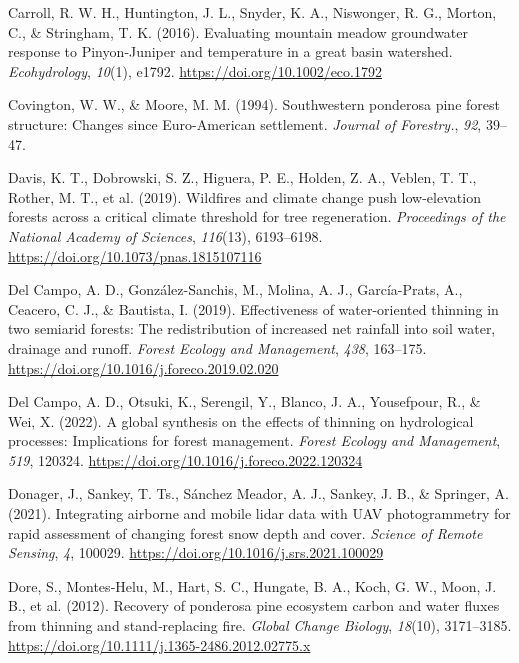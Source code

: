 \documentclass[
]{agujournal2019}
\newlength{\cslhangindent}
\newenvironment{CSLReferences}[2] %
 {\begin{list}{}{%
  \setlength{\itemindent}{0pt}
  \setlength{\leftmargin}{0pt}
  \setlength{\parsep}{0pt}
  \ifodd #1
   \setlength{\leftmargin}{\cslhangindent}
   \setlength{\itemindent}{-1\cslhangindent}
  \fi
  \setlength{\itemsep}{#2\baselineskip}}}
 {\end{list}}
\begin{document}
\begin{CSLReferences}{1}{0}
Carroll, R. W. H., Huntington, J. L., Snyder, K. A., Niswonger, R. G.,
Morton, C., \& Stringham, T. K. (2016). Evaluating mountain meadow
groundwater response to {Pinyon}‐{Juniper} and temperature in a great
basin watershed. \emph{Ecohydrology}, \emph{10}(1), e1792.
\url{https://doi.org/10.1002/eco.1792}

Covington, W. W., \& Moore, M. M. (1994). Southwestern ponderosa pine
forest structure: Changes since {Euro}-{American} settlement.
\emph{Journal of Forestry.}, \emph{92}, 39--47.

Davis, K. T., Dobrowski, S. Z., Higuera, P. E., Holden, Z. A., Veblen,
T. T., Rother, M. T., et al. (2019). Wildfires and climate change push
low-elevation forests across a critical climate threshold for tree
regeneration. \emph{Proceedings of the National Academy of Sciences},
\emph{116}(13), 6193--6198.
\url{https://doi.org/10.1073/pnas.1815107116}

Del Campo, A. D., González-Sanchis, M., Molina, A. J., García-Prats, A.,
Ceacero, C. J., \& Bautista, I. (2019). Effectiveness of water-oriented
thinning in two semiarid forests: {The} redistribution of increased net
rainfall into soil water, drainage and runoff. \emph{Forest Ecology and
Management}, \emph{438}, 163--175.
\url{https://doi.org/10.1016/j.foreco.2019.02.020}

Del Campo, A. D., Otsuki, K., Serengil, Y., Blanco, J. A., Yousefpour,
R., \& Wei, X. (2022). A global synthesis on the effects of thinning on
hydrological processes: {Implications} for forest management.
\emph{Forest Ecology and Management}, \emph{519}, 120324.
\url{https://doi.org/10.1016/j.foreco.2022.120324}

Donager, J., Sankey, T. Ts., Sánchez Meador, A. J., Sankey, J. B., \&
Springer, A. (2021). Integrating airborne and mobile lidar data with
{UAV} photogrammetry for rapid assessment of changing forest snow depth
and cover. \emph{Science of Remote Sensing}, \emph{4}, 100029.
\url{https://doi.org/10.1016/j.srs.2021.100029}

Dore, S., Montes‐Helu, M., Hart, S. C., Hungate, B. A., Koch, G. W.,
Moon, J. B., et al. (2012). Recovery of ponderosa pine ecosystem carbon
and water fluxes from thinning and stand‐replacing fire. \emph{Global
Change Biology}, \emph{18}(10), 3171--3185.
\url{https://doi.org/10.1111/j.1365-2486.2012.02775.x}


\end{CSLReferences}
\end{document}
